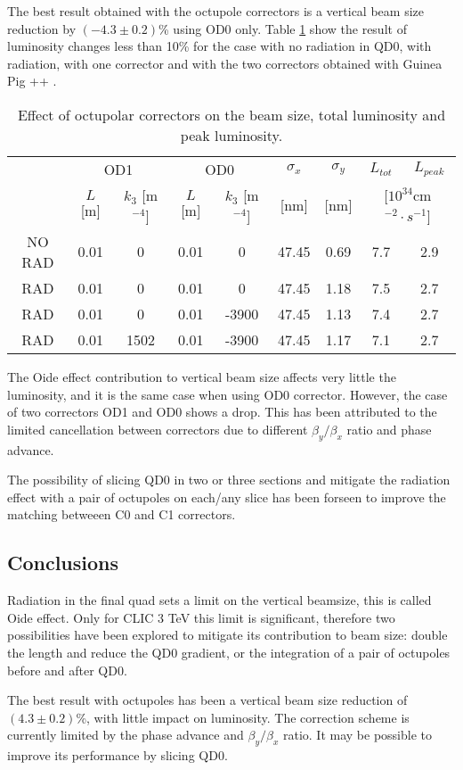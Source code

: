 The best result obtained with the octupole correctors is a vertical beam size reduction by $(-4.3\pm0.2)$\% using OD0 only. Table \ref{t:correctors} show the result of luminosity changes less than 10\% for the case with no radiation in QD0, with radiation, with one corrector and with the two correctors obtained with Guinea Pig ++ \cite{Schulte:382453}.\par
\begin{table}[!hbt]
\centering
\scriptsize
\begin{tabular}{c||c|c|c|c||c|c||c|c}\hline
& \multicolumn{2}{c|}{OD1} &\multicolumn{2}{c||}{OD0} & $\sigma_x$ & $\sigma_y$ & $L_{tot}$ & $L_{peak}$\\
& $L$ [m] & $k_3$ [m$^{-4}$] & $L$ [m] & $k_3$ [m$^{-4}$] &  [nm] & [nm] & \multicolumn{2}{c}{[$10^{34}$cm$^{-2}\cdot s^{-1}$]}\\\hline\hline
NO RAD & 0.01 & 0 & 0.01 & 0 & 47.45 & 0.69 & 7.7 & 2.9\\
RAD    & 0.01 & 0 & 0.01 & 0 & 47.45 & 1.18 & 7.5 & 2.7 \\
RAD    & 0.01 & 0 & 0.01 & -3900 & 47.45 & 1.13 & 7.4 & 2.7 \\
RAD    & 0.01 & 1502 & 0.01 & -3900 & 47.45 & 1.17 & 7.1 & 2.7 \\\hline
\end{tabular}\caption{Effect of octupolar correctors on the beam size, total luminosity and peak luminosity.}\label{t:correctors}
\end{table}
The Oide effect contribution to vertical beam size affects very little the luminosity, and it is the same case when using OD0 corrector. However, the case of two correctors OD1 and OD0 shows a drop. This has been attributed to the limited cancellation between correctors due to different $\beta_y/\beta_x$ ratio and phase advance.\par
The possibility of slicing QD0 in two or three sections and mitigate the radiation effect with a pair of octupoles on each/any slice has been forseen to improve the matching betweeen C0 and C1 correctors.\par
\subsection{Conclusions}
Radiation in the final quad sets a limit on the vertical beamsize, this is called Oide effect. Only for CLIC 3 TeV this limit is significant, therefore two possibilities have been explored to mitigate its contribution to beam size: double the length and reduce the QD0 gradient, or the integration of a pair of octupoles before and after QD0.\par
The best result with octupoles has been a vertical beam size reduction of $(4.3\pm0.2)$\%, with little impact on luminosity. The correction scheme is currently limited by the phase advance and $\beta_y/\beta_x$ ratio. It may be possible to improve its performance by slicing QD0.\par
